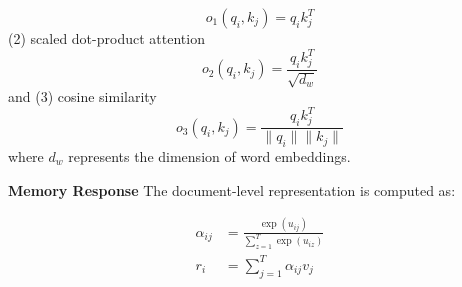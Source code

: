 \documentclass[letterpaper]{article} \usepackage{aaai20}  \usepackage{times}  \usepackage{helvet} \usepackage{courier}  \usepackage[hyphens]{url}  \usepackage{graphicx} \urlstyle{rm} \def\UrlFont{\rm}  \usepackage{graphicx}  \frenchspacing  \setlength{\pdfpagewidth}{8.5in}  \setlength{\pdfpageheight}{11in}
\begin{document}
\begin{table}[t!] 
\centering
{}
\caption{Query operation for the word \emph{Italy}.  The numbers in parentheses indicate slot index of tokens in memory $M$. The memory slots of these bold tokens in  training instances are retrieved according to the inverted index for \emph{Italy}. 
}\label{example}
\end{table}

\begin{equation}
    o_1(q_i, k_j) = q_ik_j^T
\end{equation}
(2) scaled dot-product attention \cite{vaswani2017attention}
\begin{equation}
    o_2(q_i, k_j) = \frac{q_ik_j^T}{\sqrt{d_w}}
\end{equation}
and (3) cosine similarity 
\begin{equation}
    o_3(q_i, k_j) = \frac{q_ik_j^T }{\|q_i\|\|k_j\|}
\end{equation}
where $d_w$ represents the dimension of word embeddings.

\noindent\textbf{Memory Response}
The document-level representation is computed as:

\begin{equation}
    \begin{aligned} 
        \alpha_{ij} & = \frac{\exp(u_{ij})}{\sum_{z=1}^T\exp(u_{iz})} \\
        r_i&= \sum_{j=1}^T\alpha_{ij}v_j
    \end{aligned} 
\end{equation}
\end{document}
